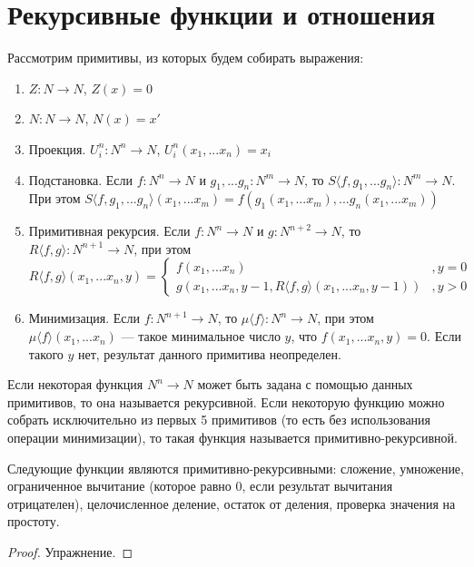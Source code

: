 \section{Рекурсивные функции и отношения}

Рассмотрим примитивы, из которых будем собирать выражения:

\begin{enumerate}
\item $Z: N \rightarrow N$, $Z(x) = 0$
\item $N: N \rightarrow N$, $N(x) = x'$
\item Проекция. $U^n_i: N^n \rightarrow N$, $U^n_i (x_1, ... x_n) = x_i$
\item Подстановка. Если $f: N^n \rightarrow N$ и $g_1, ... g_n: N^m \rightarrow N$, 
  то $S\langle{}f,g_1,...g_n\rangle: N^m \rightarrow N$.
При этом $S\langle{}f,g_1,...g_n\rangle (x_1,...x_m) = f(g_1(x_1,...x_m), ... g_n(x_1,...x_m))$
\item Примитивная рекурсия. Если $f: N^n \rightarrow N$ и $g: N^{n+2} \rightarrow N$, то
  $R\langle{}f,g\rangle: N^{n+1} \rightarrow N$, при этом
  $$R\langle{}f,g\rangle (x_1,...x_n,y) = \left\{\begin{array}{ll}
    f(x_1,...x_n) & , y = 0\\
    g(x_1,...x_n,y-1,R\langle{}f,g\rangle(x_1,...x_n,y-1)) &, y > 0
  \end{array}\right.$$
\item Минимизация. Если $f: N^{n+1} \rightarrow N$, то $\mu \langle{}f\rangle: N^n \rightarrow N$, при этом
  $\mu \langle{}f\rangle (x_1,...x_n)$ --- такое минимальное число $y$, что $f(x_1,...x_n,y) = 0$.
  Если такого $y$ нет, результат данного примитива неопределен.
\end{enumerate}

Если некоторая функция $N^n \rightarrow N$ может быть задана с помощью данных примитивов, 
то она называется рекурсивной. Если некоторую функцию можно собрать исключительно из первых 
5 примитивов (то есть без использования операции минимизации), то такая функция называется 
примитивно-рекурсивной. 

\begin{theorem}Следующие функции являются примитивно-рекурсивными:
сложение, умножение, ограниченное вычитание 
(которое равно 0, если результат вычитания отрицателен),
целочисленное деление, остаток от деления, проверка значения на
простоту.
\end{theorem}

\begin{proof}Упражнение.\end{proof}


